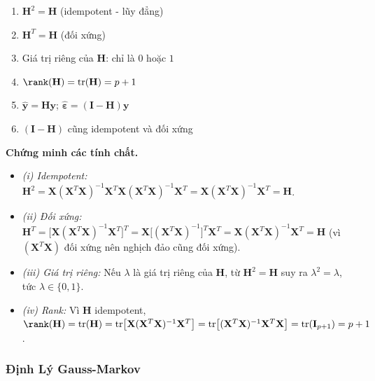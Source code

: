 \begin{tcolorbox}[mycodebox, colback=green!3!white, colframe=green!40!black,
    title={\textbf{Mệnh đề 1.1} - Tính Chất của $\mathbf{H}$}]
\begin{enumerate}[label=(\roman*)]
    \item $\mathbf{H}^2 = \mathbf{H}$ \hfill (idempotent - lũy đẳng)
    \item $\mathbf{H}^T = \mathbf{H}$ \hfill (đối xứng)
    \item Giá trị riêng của $\mathbf{H}$: chỉ là $0$ hoặc $1$
    \item $\rank(\mathbf{H}) = \mathrm{tr}(\mathbf{H}) = p+1$
    \item $\hat{\mathbf{y}} = \mathbf{H}\mathbf{y}$;\quad
          $\hat{\boldsymbol{\varepsilon}} = (\mathbf{I} - \mathbf{H})\mathbf{y}$
    \item $(\mathbf{I}-\mathbf{H})$ cũng idempotent và đối xứng
\end{enumerate}
\end{tcolorbox}

\textbf{Chứng minh các tính chất.}
\begin{itemize}
    \item \textit{(i) Idempotent:}
    $\mathbf{H}^2 = \mathbf{X}(\mathbf{X}^T\mathbf{X})^{-1}\mathbf{X}^T
                   \mathbf{X}(\mathbf{X}^T\mathbf{X})^{-1}\mathbf{X}^T
               = \mathbf{X}(\mathbf{X}^T\mathbf{X})^{-1}\mathbf{X}^T = \mathbf{H}$.
    \item \textit{(ii) Đối xứng:}
    $\mathbf{H}^T = \bigl[\mathbf{X}(\mathbf{X}^T\mathbf{X})^{-1}\mathbf{X}^T\bigr]^T
               = \mathbf{X}\bigl[(\mathbf{X}^T\mathbf{X})^{-1}\bigr]^T\mathbf{X}^T
               = \mathbf{X}(\mathbf{X}^T\mathbf{X})^{-1}\mathbf{X}^T = \mathbf{H}$
    (vì $(\mathbf{X}^T\mathbf{X})$ đối xứng nên nghịch đảo cũng đối xứng).
    \item \textit{(iii) Giá trị riêng:} Nếu $\lambda$ là giá trị riêng của $\mathbf{H}$,
    từ $\mathbf{H}^2 = \mathbf{H}$ suy ra $\lambda^2 = \lambda$, tức $\lambda \in \{0, 1\}$.
    \item \textit{(iv) Rank:} Vì $\mathbf{H}$ idempotent,
    $\rank(\mathbf{H}) = \mathrm{tr}(\mathbf{H})
    = \mathrm{tr}\bigl[\mathbf{X}(\mathbf{X}^T\mathbf{X})^{-1}\mathbf{X}^T\bigr]
    = \mathrm{tr}\bigl[(\mathbf{X}^T\mathbf{X})^{-1}\mathbf{X}^T\mathbf{X}\bigr]
    = \mathrm{tr}(\mathbf{I}_{p+1}) = p+1$.
\end{itemize}

\subsubsection{Định Lý Gauss-Markov}

